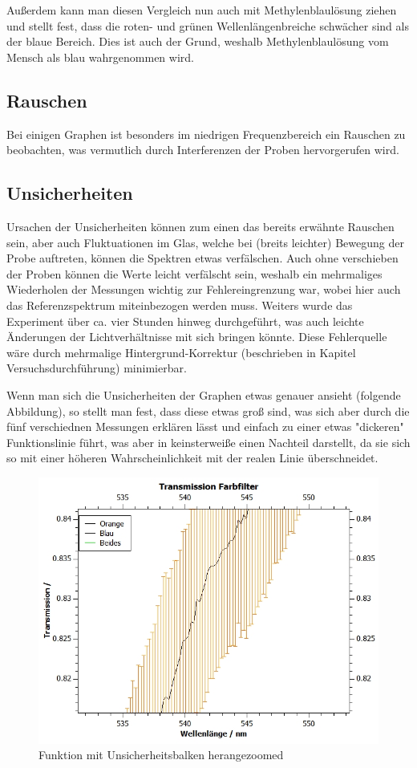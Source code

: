 \documentclass[12pt,a4paper,twoside]{article}
\begin{document}
\noindent
Außerdem kann man diesen Vergleich nun auch mit Methylenblaulösung ziehen und stellt fest, dass die roten- und grünen Wellenlängenbreiche schwächer sind als der blaue Bereich. Dies ist auch der Grund, weshalb Methylenblaulösung vom Mensch als blau wahrgenommen wird.  


\subsection{Rauschen}
Bei einigen Graphen ist besonders im niedrigen Frequenzbereich ein Rauschen zu beobachten, was vermutlich durch Interferenzen der Proben hervorgerufen wird. 

\subsection{Unsicherheiten}
Ursachen der Unsicherheiten können zum einen das bereits erwähnte Rauschen sein, aber auch Fluktuationen im Glas, welche bei (breits leichter) Bewegung der Probe auftreten, können die Spektren etwas verfälschen. 
Auch ohne verschieben der Proben können die Werte leicht verfälscht sein, weshalb ein mehrmaliges Wiederholen der Messungen wichtig zur Fehlereingrenzung war, wobei hier auch das Referenzspektrum miteinbezogen werden muss.
Weiters wurde das Experiment über ca. vier Stunden hinweg durchgeführt, was auch leichte Änderungen der Lichtverhältnisse mit sich bringen könnte. Diese Fehlerquelle wäre durch mehrmalige Hintergrund-Korrektur (beschrieben in Kapitel Versuchsdurchführung) minimierbar. \newline

\noindent
Wenn man sich die Unsicherheiten der Graphen etwas genauer ansieht (folgende Abbildung), so stellt man fest, dass diese etwas groß sind, was sich aber durch die fünf verschiednen Messungen erklären lässt und einfach zu einer etwas "dickeren" Funktionslinie führt, was aber in keinsterweiße einen Nachteil darstellt, da sie sich so mit einer höheren Wahrscheinlichkeit mit der realen Linie überschneidet. 

\begin{figure}[H]
    \centering
    \includegraphics[width=0.5\linewidth]{nudes/UnsicherheitenZoomed.jpg}
    \caption{Funktion mit Unsicherheitsbalken herangezoomed}
    \label{fig:UnsicherheitGenauer}
\end{figure}
\end{document}
